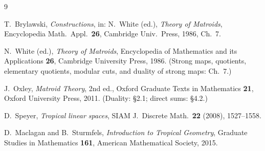 \documentclass[11pt]{article}
\theoremstyle{definition}
\theoremstyle{remark}
\begin{document}
\begin{thebibliography}{9}

T.~Brylawski,
\emph{Constructions}, in: N.~White (ed.), \emph{Theory of Matroids},
Encyclopedia Math.\ Appl.\ \textbf{26}, Cambridge Univ.\ Press, 1986, Ch.~7.

N.~White (ed.),
\emph{Theory of Matroids}, Encyclopedia of Mathematics and its Applications
\textbf{26}, Cambridge University Press, 1986. (Strong maps, quotients, elementary
quotients, modular cuts, and duality of strong maps: Ch.~7.)

J.~Oxley,
\emph{Matroid Theory}, 2nd ed., Oxford Graduate Texts in Mathematics \textbf{21},
Oxford University Press, 2011. (Duality: \S2.1; direct sums: \S4.2.)

D.~Speyer,
\emph{Tropical linear spaces}, SIAM J.\ Discrete Math.\ \textbf{22} (2008),
1527--1558.

D.~Maclagan and B.~Sturmfels,
\emph{Introduction to Tropical Geometry}, Graduate Studies in Mathematics
\textbf{161}, American Mathematical Society, 2015.

\end{thebibliography}
\end{document}

